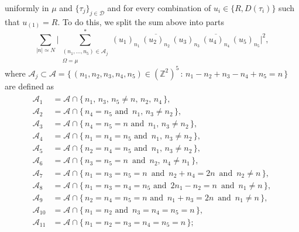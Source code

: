 \documentclass[11pt, xcolor = dvipsnames,reqno
]{amsart}
\theoremstyle{definition}
\theoremstyle{remark}
\begin{document}
uniformly in $\mu$ and $\{ \tau_j \}_{j \in \mathcal D}$ and for every combination of $u_i \in \{R, D (\tau_i)\}$ such that $u_{(1)} = R$.  To do this, we split the sum above into parts 
\begin{equation}\label{eq:To_Bound_j}
    \sum_{|n| \simeq N}
    \bigg|
    \sum_{\substack{(n_1, \ldots, n_5) \in \mathcal A_j \\ \Omega= \mu}}^*
    (u_1)_{n_1} \, \overline{(u_2)_{n_2}} \, (u_3)_{n_3} \, \overline{(u_4)_{n_4}} \, (u_5)_{n_5} 
    \bigg|^2, 
\end{equation}
where $\mathcal A_j \subset \mathcal A = \{ \, (n_1,n_2,n_3,n_4,n_5) \in (\mathbb Z^2)^5 \, : \, n_1 - n_2 + n_3 - n_4 + n_5 = n \, \} $ are defined as 
\begin{align}\label{eq:Aj}
    \begin{array}{rl}
    \mathcal{A}_1 & = \mathcal A \cap \{ \, n_1, \, n_3, \, n_5 \neq n, \, n_2, \, n_4 \, \}, \\
    \mathcal{A}_2 & = \mathcal A \cap \{ \, n_4 = n_5 \text{ and }  \, n_1, \, n_3 \neq n_2 \, \}, \\
    \mathcal{A}_3 & = \mathcal A \cap \{ \, n_4 = n_5 = n \text{ and } \, n_1, \, n_3 \neq n_2 \,  \}, \\
    \mathcal{A}_4 & = \mathcal A \cap \{  \,  n_1 = n_4 = n_5  \text{ and } \, n_1, \, n_3 \neq n_2 \, \}, \\
    \mathcal{A}_5 & = \mathcal A \cap \{  \,  n_2 = n_4 = n_5  \text{ and } \, n_1, \, n_3 \neq n_2 \,  \}, \\
    \mathcal{A}_6 & = \mathcal A \cap \{ \,  n_3 = n_5 = n \,  \text{ and } \, n_2, \, n_4 \neq n_1 \, \}, \\
    \mathcal{A}_7 & = \mathcal A \cap \{ \,  n_1 = n_3 = n_5 = n \, \text{ and } \, n_2 + n_4 = 2n \, \text{ and } \, n_2 \neq n \,\}, \\
    \mathcal{A}_8 & = \mathcal A \cap \{ \, n_1 = n_3 = n_4 = n_5 \text{ and } \, 2n_1 - n_2 = n \, \text{ and } \, n_1 \neq n \,  \}, \\
    \mathcal{A}_9 & = \mathcal A \cap \{ \,  n_2 = n_4 = n_5 = n \text{ and } \, n_1 + n_3 = 2n \, \text{ and } \, n_1 \neq n \,  \}, \\
    \mathcal{A}_{10} & = \mathcal A \cap \{ \, n_1 = n_2 \text{ and } \, n_3 = n_4 = n_5 = n \, \}, \\
    \mathcal{A}_{11} & = \mathcal A \cap \{ \,  n_1 = n_2 = n_3 = n_4 = n_5 = n \,  \};
    \end{array}
\end{align}
\end{document}

